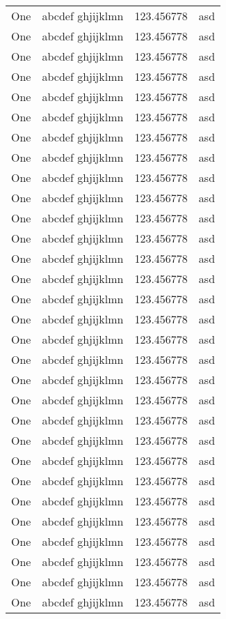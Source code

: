 \begin{longtable}{lXp{5cm}X}
	\rowcolorlight One & abcdef ghjijklmn & 123.456778 & asd \\
	\rowcolordark One & abcdef ghjijklmn & 123.456778 & asd \\
	\rowcolorlight One & abcdef ghjijklmn & 123.456778 & asd \\
	\rowcolordark One & abcdef ghjijklmn & 123.456778 & asd \\
	\rowcolorlight One & abcdef ghjijklmn & 123.456778 & asd \\
	\rowcolordark One & abcdef ghjijklmn & 123.456778 & asd \\
	\rowcolorlight One & abcdef ghjijklmn & 123.456778 & asd \\
	\rowcolordark One & abcdef ghjijklmn & 123.456778 & asd \\
	\rowcolorlight One & abcdef ghjijklmn & 123.456778 & asd \\
	\rowcolordark One & abcdef ghjijklmn & 123.456778 & asd \\
	\rowcolorlight One & abcdef ghjijklmn & 123.456778 & asd \\
	\rowcolordark One & abcdef ghjijklmn & 123.456778 & asd \\
	\rowcolorlight One & abcdef ghjijklmn & 123.456778 & asd \\
	\rowcolordark One & abcdef ghjijklmn & 123.456778 & asd \\
	\rowcolorlight One & abcdef ghjijklmn & 123.456778 & asd \\
	\rowcolordark One & abcdef ghjijklmn & 123.456778 & asd \\
	\rowcolorlight One & abcdef ghjijklmn & 123.456778 & asd \\
	\rowcolordark One & abcdef ghjijklmn & 123.456778 & asd \\
	\rowcolorlight One & abcdef ghjijklmn & 123.456778 & asd \\
	\rowcolordark One & abcdef ghjijklmn & 123.456778 & asd \\
	\rowcolorlight One & abcdef ghjijklmn & 123.456778 & asd \\
	\rowcolordark One & abcdef ghjijklmn & 123.456778 & asd \\
	\rowcolorlight One & abcdef ghjijklmn & 123.456778 & asd \\
	\rowcolordark One & abcdef ghjijklmn & 123.456778 & asd \\
	\rowcolorlight One & abcdef ghjijklmn & 123.456778 & asd \\
	\rowcolordark One & abcdef ghjijklmn & 123.456778 & asd \\
	\rowcolorlight One & abcdef ghjijklmn & 123.456778 & asd \\
	\rowcolordark One & abcdef ghjijklmn & 123.456778 & asd \\
	\rowcolorlight One & abcdef ghjijklmn & 123.456778 & asd \\
	\rowcolordark One & abcdef ghjijklmn & 123.456778 & asd \\
	
\end{longtable}
\endgroup